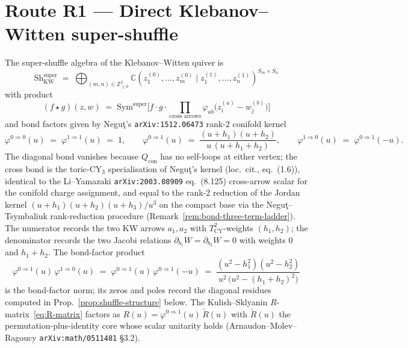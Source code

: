 \documentclass[11pt]{amsart}
\theoremstyle{definition}
\providecommand{\bZ}{\mathbb{Z}}
\providecommand{\bC}{\mathbb{C}}
\begin{document}
\section{Route R1 --- Direct Klebanov--Witten super-shuffle}
\label{sec:shuffle-route}

The super-shuffle algebra of the Klebanov--Witten quiver is
\[
  \mathrm{Sh}^{\mathrm{super}}_{\mathrm{KW}}
  \;=\;
  \bigoplus_{(m,n) \in \bZ^2_{\geq 0}}
    \bC(z^{(0)}_1, \dots, z^{(0)}_m \mid z^{(1)}_1, \dots, z^{(1)}_n)^{S_m \times S_n}
\]
with product
\[
  (f \star g)(z, w)
  \;=\;
  \mathrm{Sym}^{\mathrm{super}}\!\Biggl[f \cdot g \cdot
    \prod_{\text{cross arrows}}\!
      \varphi_{ab}\bigl(z^{(a)}_i - w^{(b)}_j\bigr)\Biggr]
\]
and bond factors given by Negu\c{t}'s \texttt{arXiv:1512.06473} rank-$2$
conifold kernel
\begin{equation}\label{eq:bond-factors}
  \varphi^{0 \Rightarrow 0}(u) \;=\;
  \varphi^{1 \Rightarrow 1}(u) \;=\; 1,
  \qquad
  \varphi^{0 \Rightarrow 1}(u) \;=\;
  \frac{(u + h_1)(u + h_2)}{u\,(u + h_1 + h_2)},
  \qquad
  \varphi^{1 \Rightarrow 0}(u) \;=\; \varphi^{0 \Rightarrow 1}(-u).
\end{equation}
The diagonal bond vanishes because $Q_{\mathrm{con}}$ has no self-loops at
either vertex; the cross bond is the toric-CY$_3$ specialisation of
Negu\c{t}'s kernel (loc.\ cit., eq.~(1.6)), identical to the Li--Yamazaki
\texttt{arXiv:2003.08909} eq.~(8.125) cross-arrow scalar for the conifold
charge assignment, and equal to the rank-$2$ reduction of the Jordan
kernel $(u + h_1)(u + h_2)(u + h_3)/u^3$ on the compact base via the
Negu\c{t}--Tsymbaliuk rank-reduction procedure
(Remark~\ref{rem:bond-three-term-ladder}). The numerator records the two
KW arrows $a_1, a_2$
with $T^2_{\mathrm{CY}}$-weights $(h_1, h_2)$; the denominator records
the two Jacobi relations $\partial_{b_1} W = \partial_{b_2} W = 0$
with weights $0$ and $h_1 + h_2$. The bond-factor product
\begin{equation}\label{eq:unitarity-bond}
  \varphi^{0 \Rightarrow 1}(u)\,\varphi^{1 \Rightarrow 0}(u)
  \;=\;
  \varphi^{0 \Rightarrow 1}(u)\,\varphi^{0 \Rightarrow 1}(-u)
  \;=\;
  \frac{(u^2 - h_1^2)(u^2 - h_2^2)}{u^2\,\bigl(u^2 - (h_1 + h_2)^2\bigr)}
\end{equation}
is the bond-factor norm; its zeros and poles record the diagonal
residues computed in Prop.~\ref{prop:shuffle-structure} below. The
Kulish--Sklyanin $R$-matrix~\eqref{eq:R-matrix} factors as
$R(u) = \varphi^{0 \Rightarrow 1}(u)\,\check{R}(u)$ with $\check{R}(u)$
the permutation-plus-identity core whose scalar unitarity holds
(Arnaudon--Molev--Ragoucy \texttt{arXiv:math/0511481} §3.2).
\end{document}
